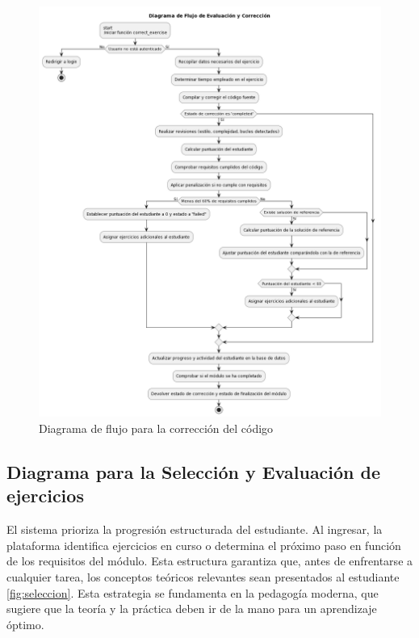 \begin{figure}[H]
    \centering
    \includegraphics[width=\textwidth]{imagenes/correcionejercicios.png}
    
    \caption{Diagrama de flujo para la corrección del código}
    \label{fig:correccion}
\end{figure}

\subsection{Diagrama para la Selección y Evaluación de ejercicios}

El sistema prioriza la progresión estructurada del estudiante. Al ingresar, la plataforma identifica ejercicios en curso o determina el próximo paso en función de los requisitos del módulo. Esta estructura garantiza que, antes de enfrentarse a cualquier tarea, los conceptos teóricos relevantes sean presentados al estudiante \ref{fig:seleccion}. Esta estrategia se fundamenta en la pedagogía moderna, que sugiere que la teoría y la práctica deben ir de la mano para un aprendizaje óptimo.


